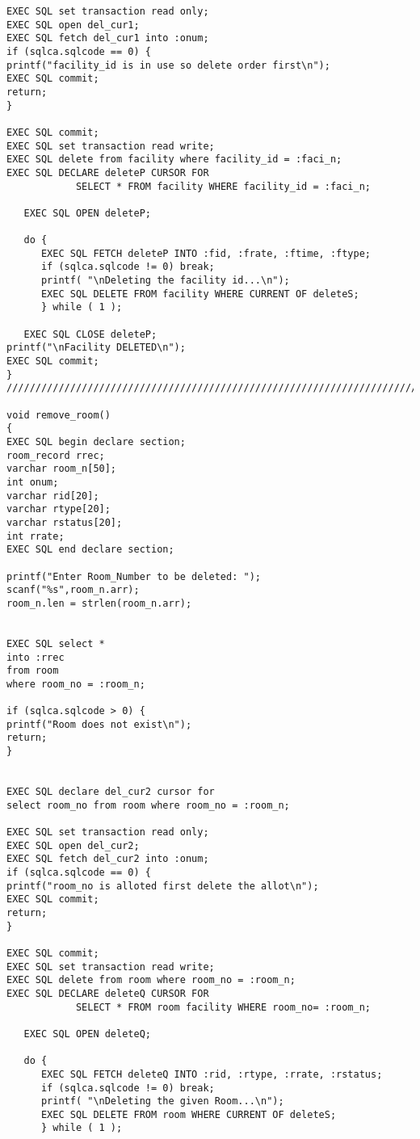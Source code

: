 \documentclass[a4,12pt]{report}
\begin{document}
\begin{lstlisting}
EXEC SQL set transaction read only;
EXEC SQL open del_cur1;
EXEC SQL fetch del_cur1 into :onum;
if (sqlca.sqlcode == 0) {
printf("facility_id is in use so delete order first\n");
EXEC SQL commit;
return;
}

EXEC SQL commit;
EXEC SQL set transaction read write;
EXEC SQL delete from facility where facility_id = :faci_n;
EXEC SQL DECLARE deleteP CURSOR FOR
            SELECT * FROM facility WHERE facility_id = :faci_n;
 
   EXEC SQL OPEN deleteP;
 
   do {
      EXEC SQL FETCH deleteP INTO :fid, :frate, :ftime, :ftype;
      if (sqlca.sqlcode != 0) break;
      printf( "\nDeleting the facility id...\n");
      EXEC SQL DELETE FROM facility WHERE CURRENT OF deleteS;
      } while ( 1 );
 
   EXEC SQL CLOSE deleteP;
printf("\nFacility DELETED\n");
EXEC SQL commit;
}
////////////////////////////////////////////////////////////////////////////////////////////////////////////////////////////////////////////

void remove_room() 
{
EXEC SQL begin declare section;
room_record rrec;
varchar room_n[50];
int onum;
varchar rid[20];
varchar rtype[20];
varchar rstatus[20];
int rrate;
EXEC SQL end declare section;

printf("Enter Room_Number to be deleted: ");
scanf("%s",room_n.arr);
room_n.len = strlen(room_n.arr);


EXEC SQL select *
into :rrec
from room
where room_no = :room_n;

if (sqlca.sqlcode > 0) {
printf("Room does not exist\n");
return;
}


EXEC SQL declare del_cur2 cursor for
select room_no from room where room_no = :room_n;

EXEC SQL set transaction read only;
EXEC SQL open del_cur2;
EXEC SQL fetch del_cur2 into :onum;
if (sqlca.sqlcode == 0) {
printf("room_no is alloted first delete the allot\n");
EXEC SQL commit;
return;
}

EXEC SQL commit;
EXEC SQL set transaction read write;
EXEC SQL delete from room where room_no = :room_n;
EXEC SQL DECLARE deleteQ CURSOR FOR
            SELECT * FROM room facility WHERE room_no= :room_n;
 
   EXEC SQL OPEN deleteQ;
 
   do {
      EXEC SQL FETCH deleteQ INTO :rid, :rtype, :rrate, :rstatus;
      if (sqlca.sqlcode != 0) break;
      printf( "\nDeleting the given Room...\n");
      EXEC SQL DELETE FROM room WHERE CURRENT OF deleteS;
      } while ( 1 );
 

\end{lstlisting}
\end{document}
